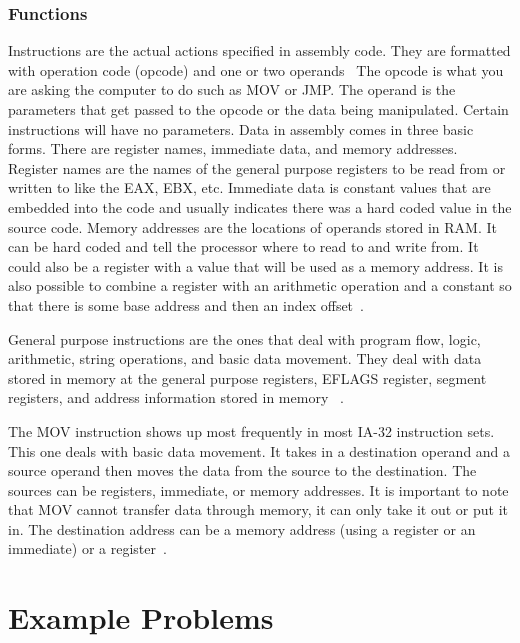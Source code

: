 \subsubsection{Functions}
Instructions are the actual actions specified in assembly code. 
They are formatted with operation code (opcode) and one or two operands~\cite{Reversing} 
The opcode is what you are asking the computer to do such as MOV or JMP. 
The operand is the parameters that get passed to the opcode or the data being manipulated. 
Certain instructions will have no parameters. Data in assembly comes in three basic forms. 
There are register names, immediate data, and memory addresses. 
Register names are the names of the general purpose registers to be read from or written to like the EAX, EBX, etc. 
Immediate data is constant values that are embedded into the code and usually indicates there was a hard coded value in the source code. 
Memory addresses are the locations of operands stored in RAM. 
It can be hard coded and tell the processor where to read to and write from. 
It could also be a register with a value that will be used as a memory address. 
It is also possible to combine a register with an arithmetic operation and a constant so that there is some base address and then an index offset~\cite{Reversing}.

General purpose instructions are the ones that deal with program flow, logic, arithmetic, string operations, and basic data movement. 
They deal with data stored in memory at the general purpose registers, EFLAGS register, segment registers, and address information stored in memory ~\cite{Reversing}.

The MOV instruction shows up most frequently in most IA-32 instruction sets. 
This one deals with basic data movement. 
It takes in a destination operand and a source operand then moves the data from the source to the destination. 
The sources can be registers, immediate, or memory addresses. 
It is important to note that MOV cannot transfer data through memory, it can only take it out or put it in. 
The destination address can be a memory address (using a register or an immediate) or a register~\cite{Reversing}.




\section{Example Problems}
